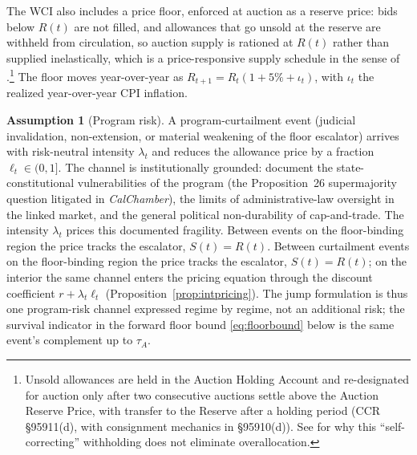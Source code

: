 \documentclass[11pt,letterpaper]{article}
\theoremstyle{plain}
\theoremstyle{definition}
\newtheorem{assumption}{Assumption}
\numberwithin{equation}{section}
\begin{document}
The WCI also includes a price floor, enforced at auction as a reserve price: bids below $R(t)$ are not filled, and allowances that go unsold at the reserve are withheld from circulation, so auction supply is rationed at $R(t)$ rather than supplied inelastically, which is a price-responsive supply schedule in the sense of \citet{burtraw2022jaere}.\footnote{Unsold allowances are held in the Auction Holding Account and re-designated for auction only after two consecutive auctions settle above the Auction Reserve Price, with transfer to the Reserve after a holding period (CCR \S95911(d), with consignment mechanics in \S95910(d)). See \citet{inman2018selfcorrecting} for why this ``self-correcting'' withholding does not eliminate overallocation.} The floor moves year-over-year as $R_{t+1}=R_t(1+5\%+\iota_t)$, with $\iota_t$ the realized year-over-year CPI inflation.

\begin{assumption}[Program risk]\label{ass:jump}
A program-curtailment event (judicial invalidation, non-extension, or material weakening of the floor escalator) arrives with risk-neutral intensity $\lambda_t$ and reduces the allowance price by a fraction $\ell_t\in(0,1]$. The channel is institutionally grounded: \citet{coghlan2016} document the state-constitutional vulnerabilities of the program (the Proposition~26 supermajority question litigated in \emph{CalChamber}), \citet{cullenward2015} the limits of administrative-law oversight in the linked market, and \citet{rabe2016} the general political non-durability of cap-and-trade. The intensity $\lambda_t$ prices this documented fragility. Between events on the floor-binding region the price tracks the escalator, $S(t)=R(t)$. Between curtailment events on the floor-binding region the price tracks the escalator, $S(t)=R(t)$; on the interior the same channel enters the pricing equation through the discount coefficient $r+\lambda_t\ell_t$ (Proposition~\ref{prop:intpricing}). The jump formulation is thus one program-risk channel expressed regime by regime, not an additional risk; the survival indicator in the forward floor bound \eqref{eq:floorbound} below is the same event's complement up to $\tau_A$.
\end{assumption}
\end{document}
